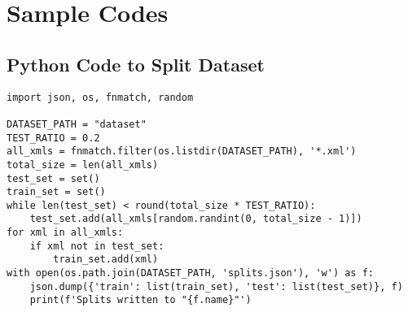 \chapter{Sample Codes}
    \section{Python Code to Split Dataset}\label{app:ds_split}
        \begin{verbatim}
import json, os, fnmatch, random

DATASET_PATH = "dataset"
TEST_RATIO = 0.2
all_xmls = fnmatch.filter(os.listdir(DATASET_PATH), '*.xml')
total_size = len(all_xmls)
test_set = set()
train_set = set()
while len(test_set) < round(total_size * TEST_RATIO):
    test_set.add(all_xmls[random.randint(0, total_size - 1)])
for xml in all_xmls:
    if xml not in test_set:
        train_set.add(xml)
with open(os.path.join(DATASET_PATH, 'splits.json'), 'w') as f:
    json.dump({'train': list(train_set), 'test': list(test_set)}, f)
    print(f'Splits written to "{f.name}"')
        \end{verbatim}
